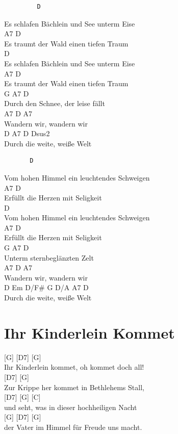 \documentclass[
  letterpaper,
]{scrbook}
\begin{document}
\begin{verbatim}
         D
\end{verbatim}

Es schlafen Bächlein und See unterm Eise\\
A7 D\\
Es traumt der Wald einen tiefen Traum\\
D\\
Es schlafen Bächlein und See unterm Eise\\
A7 D\\
Es traumt der Wald einen tiefen Traum\\
G A7 D\\
Durch den Schnee, der leise fällt\\
A7 D A7\\
Wandern wir, wandern wir\\
D A7 D Dsus2\\
Durch die weite, weiße Welt

\begin{verbatim}
       D
\end{verbatim}

Vom hohen Himmel ein leuchtendes Schweigen\\
A7 D\\
Erfüllt die Herzen mit Seligkeit\\
D\\
Vom hohen Himmel ein leuchtendes Schweigen\\
A7 D\\
Erfüllt die Herzen mit Seligkeit\\
G A7 D\\
Unterm sternbeglänzten Zelt\\
A7 D A7\\
Wandern wir, wandern wir\\
D Em D/F\# G D/A A7 D\\
Durch die weite, weiße Welt

\hypertarget{ihr-kinderlein-kommet}{%
\chapter{Ihr Kinderlein Kommet}\label{ihr-kinderlein-kommet}}

{[}G{]} {[}D7{]} {[}G{]}\\
Ihr Kinderlein kommet, oh kommet doch all!\\
{[}D7{]} {[}G{]}\\
Zur Krippe her kommet in Bethlehems Stall,\\
{[}D7{]} {[}G{]} {[}C{]}\\
und seht, was in dieser hochheiligen Nacht\\
{[}G{]} {[}D7{]} {[}G{]}\\
der Vater im Himmel für Freude uns macht.
\end{document}
